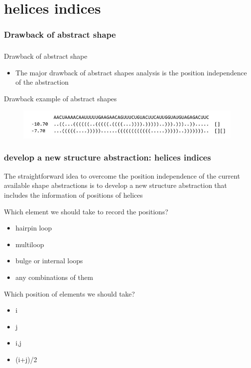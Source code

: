 \documentclass[ignorenonframetext,10pt]{beamer}
\begin{document}
\section{helices indices}
\frametitle{Drawback of abstract shape}
\begin{frame}
\frametitle{}
   \begin{block}{\small Drawback of abstract shape}
   \begin{itemize} 
   \item The major drawback of abstract shapes analysis is the position
   independence of the abstraction
   \end{itemize}
   \end{block}
   \begin{block}{\small Drawback example of abstract shapes}
   \begin{figure}
     \includegraphics[scale=0.55]{images/drawback_2.jpg} 
   \end{figure}
   \end{block}
\end{frame}


\begin{frame}
\frametitle{develop a new structure abstraction: helices indices}
    The straightforward idea to overcome the position independence of the current available shape abstractions is to develop a new structure abstraction that includes the information of positions of helices
    \begin{block}{Which element we should take to record the positions?}
    \begin{itemize} 
    \item hairpin loop
    \item multiloop
    \item bulge or internal loops
    \item any combinations of them
    \end{itemize}
    \end{block}
    \begin{block}{Which position of elements we should take?}
    \begin{itemize} 
    \item i
    \item j   
    \item i,j
    \item (i+j)/2
    \end{itemize}    
    \end{block}
\end{frame}
\end{document}
